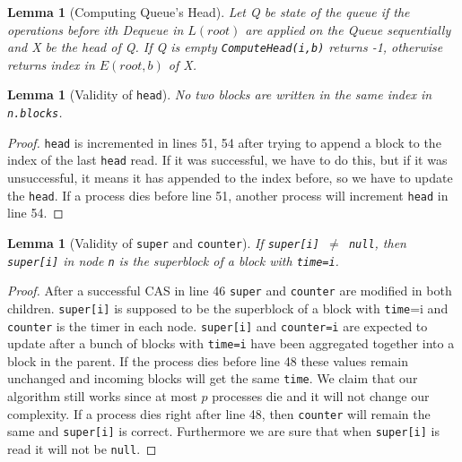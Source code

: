 \documentclass[10pt]{article}
\newtheorem{lemma}[theorem]{Lemma}
\theoremstyle{definition}
\begin{document}
\begin{lemma}[Computing Queue's Head] \label{computeHead}
  Let Q be state of the queue if the operations before ith Dequeue in $L(root)$ are applied on the Queue sequentially and X be the head of Q. If Q is empty \texttt{ComputeHead(i,b)} returns -1, otherwise
 returns index in $E(root,b)$ of X.
  \end{lemma}

\begin{lemma}[Validity of \texttt{head}]\label{head}
No two blocks are written in the same index in \texttt{n.blocks}.
\end{lemma}
\begin{proof}
  \texttt{head} is incremented in lines 51, 54 after trying to append a block to the index of the last \texttt{head} read. If it was successful, we have to do this, but if it was unsuccessful, it means it has appended to the index before, so we have to update the \texttt{head}. If a process dies before line 51, another process will increment \texttt{head} in line 54.
\end{proof} 

\begin{lemma}[Validity of \texttt{super} and \texttt{counter}]\label{superCounter}
If \texttt{super[i] $\neq$ null}, then \texttt{super[i]} in node \texttt{n} is the superblock of a block with \texttt{time=i}.
\end{lemma}
\begin{proof}
After a successful CAS in line 46 \texttt{super} and \texttt{counter} are modified in both children. \texttt{super[i]} is supposed to be the superblock of a block with \texttt{time}=i and \texttt{counter} is the timer in each node. \texttt{super[i]} and \texttt{counter=i} are expected to update after a bunch of blocks with \texttt{time=i} have been aggregated together into a block in the parent. If the process dies before line 48 these values remain unchanged and incoming blocks will get the same \texttt{time}. We claim that our algorithm still works since at most $p$ processes die and it will not change our complexity. If a process dies right after line 48, then \texttt{counter} will remain the same and \texttt{super[i]} is correct. Furthermore we are sure that when \texttt{super[i]} is read it will not be \texttt{null}.
\end{proof}
\end{document}
